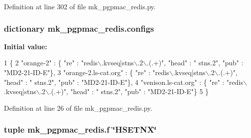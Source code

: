 Definition at line 302 of file mk\-\_\-pgpmac\-\_\-redis.\-py.

\hypertarget{namespacemk__pgpmac__redis_a9dc9b1bd47efd207604312cd60637526}{
\subsubsection[{configs}]{\setlength{\rightskip}{0pt plus 5cm}dictionary mk\-\_\-pgpmac\-\_\-redis.\-configs}}\label{namespacemk__pgpmac__redis_a9dc9b1bd47efd207604312cd60637526}
{\bfseries Initial value\-:}
\begin{DoxyCode}
1 \{
2     \textcolor{stringliteral}{"orange-2"}            : \{ \textcolor{stringliteral}{"re"} : \textcolor{stringliteral}{"redis\(\backslash\).kvseq|stns\(\backslash\).2\(\backslash\).(.+)"}, \textcolor{stringliteral}{"head"} : \textcolor{stringliteral}{"
      stns.2"}, \textcolor{stringliteral}{"pub"} : \textcolor{stringliteral}{"MD2-21-ID-E"}\},
3     \textcolor{stringliteral}{"orange-2.ls-cat.org"} : \{ \textcolor{stringliteral}{"re"} : \textcolor{stringliteral}{"redis\(\backslash\).kvseq|stns\(\backslash\).2\(\backslash\).(.+)"}, \textcolor{stringliteral}{"head"} : \textcolor{stringliteral}{"
      stns.2"}, \textcolor{stringliteral}{"pub"} : \textcolor{stringliteral}{"MD2-21-ID-E"}\},
4     \textcolor{stringliteral}{"venison.ls-cat.org"}  : \{ \textcolor{stringliteral}{"re"} : \textcolor{stringliteral}{"redis\(\backslash\).kvseq|stns\(\backslash\).2\(\backslash\).(.+)"}, \textcolor{stringliteral}{"head"} : \textcolor{stringliteral}{"
      stns.2"}, \textcolor{stringliteral}{"pub"} : \textcolor{stringliteral}{"MD2-21-ID-E"}\}
5 \}
\end{DoxyCode}


Definition at line 26 of file mk\-\_\-pgpmac\-\_\-redis.\-py.

\hypertarget{namespacemk__pgpmac__redis_a057fe7457503e0de97edcf855591ed58}{
\subsubsection[{f}]{\setlength{\rightskip}{0pt plus 5cm}tuple mk\-\_\-pgpmac\-\_\-redis.\-f \char`\"{}H\-S\-E\-T\-N\-X\char`\"{}}}\label{namespacemk__pgpmac__redis_a057fe7457503e0de97edcf855591ed58}


